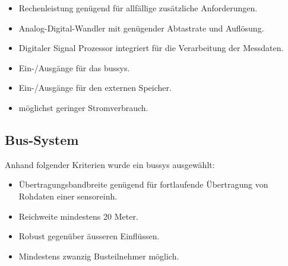 \begin{itemize}
\item Rechenleistung genügend für allfällige zusätzliche Anforderungen.
\item Analog-Digital-Wandler mit genügender Abtastrate und Auflösung.
\item Digitaler Signal Prozessor integriert für die Verarbeitung der Messdaten.
\item Ein-/Ausgänge für das \gls{bussys}.
\item Ein-/Ausgänge für den externen Speicher.
\item möglichst geringer Stromverbrauch.
\end{itemize}


\subsection{Bus-System}
Anhand folgender Kriterien wurde ein \gls{bussys} ausgewählt:

\begin{itemize}
\item Übertragungsbandbreite genügend für fortlaufende Übertragung von Rohdaten einer \gls{sensoreinh}.
\item Reichweite mindestens 20 Meter.
\item Robust gegenüber äusseren Einflüssen.
\item Mindestens zwanzig Busteilnehmer möglich.
\end{itemize}


